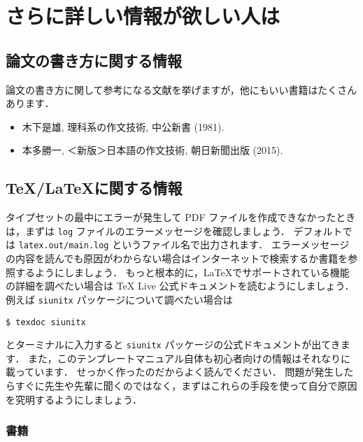 \chapter{さらに詳しい情報が欲しい人は}
\label{ch:information}

\section{論文の書き方に関する情報}
\label{sec:thesisinfo}

論文の書き方に関して参考になる文献を挙げますが，他にもいい書籍はたくさんあります．

\begin{itemize}
    \item 木下是雄, 理科系の作文技術, 中公新書 (1981).
    \item 本多勝一, ＜新版＞日本語の作文技術, 朝日新聞出版 (2015).
\end{itemize}

\section{\TeX/\LaTeX に関する情報}
\label{sec:latexinfo}

タイプセットの最中にエラーが発生して PDF ファイルを作成できなかったときは，まずは \verb|log| ファイルのエラーメッセージを確認しましょう．
デフォルトでは \verb|latex.out/main.log| というファイル名で出力されます．
エラーメッセージの内容を読んでも原因がわからない場合はインターネットで検索するか書籍を参照するようにしましょう．
もっと根本的に，\LaTeX でサポートされている機能の詳細を調べたい場合は TeX Live 公式ドキュメントを読むようにしましょう．
例えば \verb|siunitx| パッケージについて調べたい場合は
\begin{tcolorbox}
\begin{verbatim}
$ texdoc siunitx
\end{verbatim}
\end{tcolorbox}
とターミナルに入力すると \verb|siunitx| パッケージの公式ドキュメントが出てきます．
また，このテンプレートマニュアル自体も初心者向けの情報はそれなりに載っています．
せっかく作ったのだからよく読んでください．
問題が発生したらすぐに先生や先輩に聞くのではなく，まずはこれらの手段を使って自分で原因を究明するようにしましょう．

\subsection{書籍}
\label{ssec:book}

